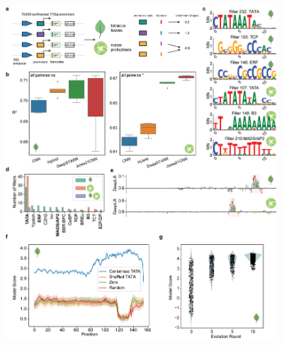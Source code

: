 \begin{figure}[p]
    \centering
    \includegraphics[width=0.9\textwidth, height=0.745\textheight]{1_figures-and-files/figure2.png}

\end{figure}
